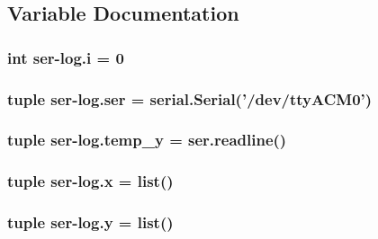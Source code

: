 \subsection{Variable Documentation}
\hypertarget{namespaceser-log_a07a12eb5896dee0953b2f34bf4e3e0d8}{
\subsubsection[{i}]{\setlength{\rightskip}{0pt plus 5cm}int {\bf ser}-\/log.\-i = 0}}\label{namespaceser-log_a07a12eb5896dee0953b2f34bf4e3e0d8}
\hypertarget{namespaceser-log_ae5e2c2855fe8c235874474c5277745ac}{
\subsubsection[{ser}]{\setlength{\rightskip}{0pt plus 5cm}tuple ser-\/log.\-ser = serial.\-Serial('/dev/tty\-A\-C\-M0')}}\label{namespaceser-log_ae5e2c2855fe8c235874474c5277745ac}
\hypertarget{namespaceser-log_af746ba3a68039d15d0a46e905dc990d2}{
\subsubsection[{temp\-\_\-y}]{\setlength{\rightskip}{0pt plus 5cm}tuple {\bf ser}-\/log.\-temp\-\_\-y = ser.\-readline()}}\label{namespaceser-log_af746ba3a68039d15d0a46e905dc990d2}
\hypertarget{namespaceser-log_ad4c918427408ee85c0def9ccf3a8cdaa}{
\subsubsection[{x}]{\setlength{\rightskip}{0pt plus 5cm}tuple {\bf ser}-\/log.\-x = list()}}\label{namespaceser-log_ad4c918427408ee85c0def9ccf3a8cdaa}
\hypertarget{namespaceser-log_a6381ab980f595f0e94c91312cc3020c5}{
\subsubsection[{y}]{\setlength{\rightskip}{0pt plus 5cm}tuple {\bf ser}-\/log.\-y = list()}}\label{namespaceser-log_a6381ab980f595f0e94c91312cc3020c5}
